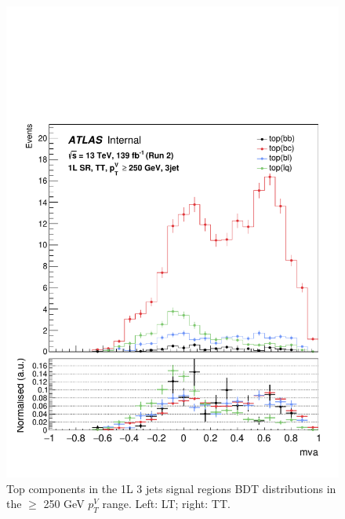 \begin{figure}[h!]
\includegraphics[scale=0.4]{Images/VH/top/OneLepton_top_2tttag3jet_SR_250ptv_mva.pdf}
\caption{Top components in the 1L 3 jets signal regions BDT distributions in the $\geq$ 250 GeV $p_T^V$ range. Left: LT; right: TT.}
\label{fig:topContentSR}
\end{figure}

